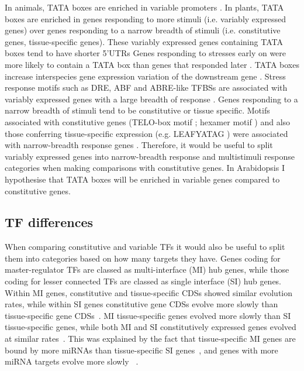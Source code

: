 \documentclass[../main.tex]{subfiles}
\begin{document}
In animals, TATA boxes are enriched in variable promoters \autocite{engstromGenomicRegulatoryBlocks2007,carninciGenomewideAnalysisMammalian2006}.
In plants, TATA boxes are enriched in genes responding to more stimuli (i.e. variably expressed genes) over genes responding to a narrow breadth of stimuli (i.e. constitutive genes, tissue-specific genes).
These variably expressed genes containing TATA boxes tend to have shorter 5'UTRs \autocite{waltherRegulatoryCodeTranscriptional2007,molinaGenomeWideAnalysis2005,lichtenbergWordLandscapeNoncoding2009}
Genes responding to stresses early on were more likely to contain a TATA box than genes that responded later \autocite{waltherRegulatoryCodeTranscriptional2007}.
TATA boxes increase interspecies gene expression variation of the downstream gene \autocite{tiroshGeneticSignatureInterspecies2006}.
Stress response motifs such as DRE, ABF and ABRE-like TFBSs \autocite{yamaguchi-shinozakiNovelCisactingElement1994} are associated with variably expressed genes with a large breadth of response \autocite{waltherRegulatoryCodeTranscriptional2007}.
Genes responding to a narrow breadth of stimuli tend to be constitutive or tissue specific.
Motifs associated with constitutive genes (TELO-box motif \autocite{tremousayguePlantInterstitialTelomere1999}; hexamer motif \autocite{chaubetIdentificationCiselementsRegulating1996}) and also those conferring tissue-specific expression (e.g. LEAFYATAG \autocite{kamiyaIsolationCharacterizationRice2003}) were associated with narrow-breadth response genes \autocite{waltherRegulatoryCodeTranscriptional2007}. Therefore, it would be useful to split variably expressed genes into narrow-breadth response and multistimuli response categories when making comparisons with constitutive genes.
In Arabidopsis I hypothesise that TATA boxes will be enriched in variable genes compared to constitutive genes.

\subsection{TF differences}

When comparing constitutive and variable TFs it would also be useful to split them into categories based on how many targets they have. 
Genes coding for master-regulator TFs are classed as multi\hyp{}interface (MI) hub genes, while those coding for lesser connected TFs are classed as single interface (SI) hub genes.
Within MI genes, constitutive and tissue-specific CDSs showed similar evolution rates, while within SI genes constitutive gene CDSs evolve more slowly than tissue-specific gene CDSs~\autocite{podderMultifunctionalityDominantlyDetermines2009}.
MI tissue-specific genes evolved more slowly than SI tissue-specific genes, while both MI and SI constitutively expressed genes evolved at similar rates~\autocite{biswasEvolutionaryRateHeterogeneity2018}.
This was explained by the fact that tissue-specific MI genes are bound by more miRNAs than tissue-specific SI genes~\autocite{biswasEvolutionaryRateHeterogeneity2018}, and genes with more miRNA targets evolve more slowly ~\autocite{chengRelationshipEvolutionMicroRNA2009}.
\end{document}
